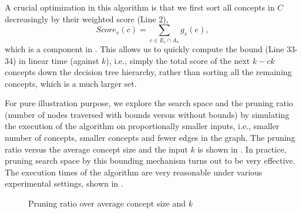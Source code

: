 A crucial optimization in this algorithm is that we first sort
all concepts in $C$ decreasingly by their weighted score (Line 2),
\[Score_v(c) = \sum_{e\in E_c \cap A_v} g_v(e),\]
which is a component in . This allows us to quickly
compute the bound (Line 33-34) in linear time (against $k$), i.e., simply
the total score of the next $k-ck$ concepts down the decision
tree hierarchy, rather than sorting all the remaining concepts,
which is a much larger set.

For pure illustration purpose, we explore
the search space and the pruning ratio (number of nodes traversed with
bounds versus without bounds) by simulating the execution
of the algorithm on proportionally smaller inputs, i.e., smaller
number of concepts, smaller concepts and fewer edges in the graph.
The pruning ratio versus the average concept size and
the input $k$ is shown in .
In practice, pruning search space by this bounding mechanism turns
out to be very effective. The execution times of the algorithm are
very reasonable under various experimental settings,
shown in .

\begin{figure}[th]
\centering
{}
\caption{Pruning ratio over average concept size and $k$}
\label{fig:complexity}
\end{figure}


